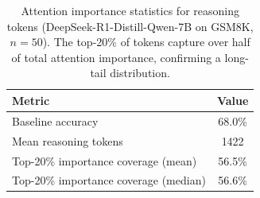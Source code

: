 \begin{table}[t]
\centering
\caption{Attention importance statistics for reasoning tokens
(DeepSeek-R1-Distill-Qwen-7B on GSM8K, $n=50$).
The top-20\% of tokens capture over half of total attention importance,
confirming a long-tail distribution.}
\label{tab:importance_stats}
\vskip 0.1in
\begin{tabular}{lc}
\toprule
\textbf{Metric} & \textbf{Value} \\
\midrule
Baseline accuracy          & 68.0\% \\
Mean reasoning tokens      & 1422 \\
Top-20\% importance coverage (mean)   & 56.5\% \\
Top-20\% importance coverage (median) & 56.6\% \\
\bottomrule
\end{tabular}
\end{table}
